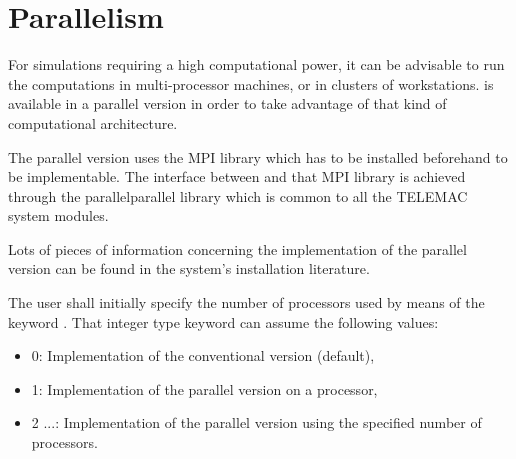\chapter{Parallelism}

For simulations requiring a high computational power, it can be advisable to
run the computations in multi-processor machines, or in clusters of
workstations.  is available in a parallel version in order to take
advantage of that kind of computational architecture.

The  parallel version uses the MPI library which has to be installed
beforehand to be implementable. The interface between  and that MPI
library is achieved through the parallelparallel library which is common to all
the TELEMAC system modules.

Lots of pieces of information concerning the implementation of the parallel
version can be found in the system's installation literature.

The user shall initially specify the number of processors used by means of the
keyword . That integer type keyword can assume the
following values:

\begin{itemize}
\item  0: Implementation of the conventional  version (default),

\item  1: Implementation of the parallel  version on a processor,

\item  2 ...: Implementation of the parallel  version using the
specified number of processors.
\end{itemize}
